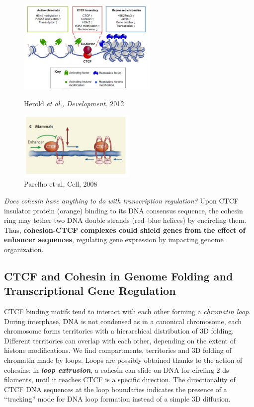 \begin{figure}[!htb]
   \begin{minipage}{0.48\textwidth}
     \centering
     \includegraphics[width=0.6\textwidth]{../_resources/Screenshot_2022-10-14_at_12-11-11.png}
\caption{Herold \emph{et al., Development,} 2012}
\label{fig:chrom}
   \end{minipage}\hfill
   \begin{minipage}{0.48\textwidth}
     \centering
     \includegraphics[width=0.5\textwidth]{../_resources/Screenshot_2022-10-14_at_12-10-46.png}
\caption{Parelho et al, Cell, 2008}
\label{fig:cohe}
   \end{minipage}
\end{figure}

\emph{Does cohesin have anything to do with transcription regulation?}
Upon CTCF insulator protein (orange) binding to its DNA consensus sequence, the cohesin ring may tether two DNA double strands (red--blue helices) by encircling them. Thus, \textbf{cohesion-CTCF complexes could shield genes from the effect of enhancer sequences}, regulating gene expression by impacting genome organization.

\subsection{CTCF and Cohesin in Genome Folding and Transcriptional Gene Regulation}

CTCF binding motifs tend to interact with each other forming a \emph{chromatin loop}. During interphase, DNA is not condensed as in a canonical chromosome, each chromosome forms territories with a hierarchical distribution of 3D folding. Different territories can overlap with each other, depending on the extent of histone modifications. We find compartments, territories and 3D folding of chromatin made by loops. Loops are possibly obtained thanks to the action of cohesins: in \textbf{\emph{loop extrusion}}, a cohesin can slide on DNA for circling 2 ds filaments, until it reaches CTCF is a specific direction. The directionality of CTCF DNA sequences at the loop boundaries indicates the presence of a ``tracking'' mode for DNA loop formation instead of a simple 3D diffusion.

